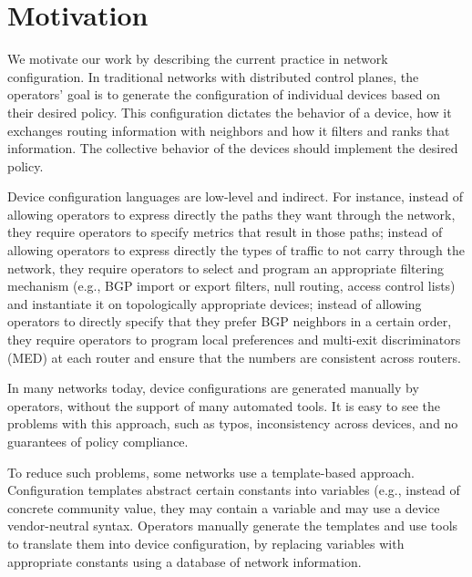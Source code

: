 \section{Motivation}
\label{sec:motivation}

We motivate our work by describing the current practice in network configuration. In traditional networks with distributed control planes, the operators' goal is to generate the configuration of individual devices based on their desired policy. This configuration dictates the behavior of a device, how it exchanges routing information with neighbors and how it filters and ranks that information. The collective behavior of the devices should implement the desired policy.

Device configuration languages are low-level and indirect. For instance, instead of allowing operators to express directly the paths they want through the network, they require operators to specify metrics that result in those paths; instead of allowing operators to express directly the types of traffic to not carry through the network, they require operators to select and program an appropriate filtering mechanism (e.g., BGP import or export filters, null routing,  access control lists) and instantiate it on topologically appropriate devices; instead of allowing operators to directly specify that they prefer BGP neighbors in a certain order, they require operators to program local preferences and multi-exit discriminators (MED) at each router and ensure that the numbers are consistent across routers.

In many networks today, device configurations are generated manually by operators, without the support of many automated tools. It is easy to see the problems with this approach, such as typos, inconsistency across devices, and no guarantees of policy compliance.

To reduce such problems, some networks use a template-based approach. Configuration templates abstract certain constants into variables (e.g., instead of concrete community value, they may contain a variable {\small {}} and may use a device vendor-neutral syntax. Operators manually generate the templates and use tools to translate them into device configuration, by replacing variables with appropriate constants using a database of network information.




